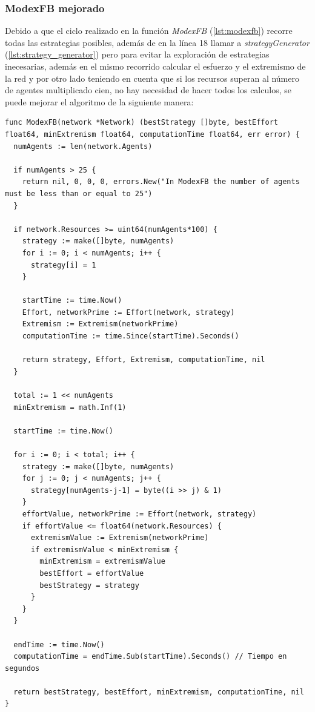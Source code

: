 \documentclass[letterpaper,10pt]{article}
\begin{document}
\subsubsection*{ModexFB mejorado}

Debido a que el ciclo realizado en la función \textit{ModexFB} (\ref{lst:modexfb}) recorre todas las estrategias posibles, además de en la línea 18 llamar a \textit{strategyGenerator} (\ref{lst:strategy_generator}) pero para evitar la exploración de estrategias inecesarias, además en el mismo recorrido calcular el esfuerzo y el extremismo de la red y por otro lado teniendo en cuenta que si los recursos superan al número de agentes multiplicado cien, no hay necesidad de hacer todos los calculos, se puede mejorar el algoritmo de la siguiente manera:
\begin{lstlisting}[caption={ModexFB mejorado}, label={lst:modexfb_mejorado}]
func ModexFB(network *Network) (bestStrategy []byte, bestEffort float64, minExtremism float64, computationTime float64, err error) {
  numAgents := len(network.Agents)

  if numAgents > 25 {
    return nil, 0, 0, 0, errors.New("In ModexFB the number of agents must be less than or equal to 25")
  }

  if network.Resources >= uint64(numAgents*100) {
    strategy := make([]byte, numAgents)
    for i := 0; i < numAgents; i++ {
      strategy[i] = 1
    }

    startTime := time.Now()
    Effort, networkPrime := Effort(network, strategy)
    Extremism := Extremism(networkPrime)
    computationTime := time.Since(startTime).Seconds()

    return strategy, Effort, Extremism, computationTime, nil
  }

  total := 1 << numAgents
  minExtremism = math.Inf(1)

  startTime := time.Now()

  for i := 0; i < total; i++ {
    strategy := make([]byte, numAgents)
    for j := 0; j < numAgents; j++ {
      strategy[numAgents-j-1] = byte((i >> j) & 1)
    }
    effortValue, networkPrime := Effort(network, strategy)
    if effortValue <= float64(network.Resources) {
      extremismValue := Extremism(networkPrime)
      if extremismValue < minExtremism {
        minExtremism = extremismValue
        bestEffort = effortValue
        bestStrategy = strategy
      }
    }
  }

  endTime := time.Now()
  computationTime = endTime.Sub(startTime).Seconds() // Tiempo en segundos

  return bestStrategy, bestEffort, minExtremism, computationTime, nil
}
\end{lstlisting}
\end{document}

